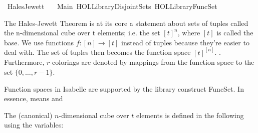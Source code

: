 %
\begin{isabellebody}%
%
%
\isadelimtheory
%
\endisadelimtheory
%
\isatagtheory
{}\isamarkupfalse%
\ {\isachardoublequoteopen}Hales{\isacharminus}{\kern0pt}Jewett{\isachardoublequoteclose}\isanewline
\ \ \ Main\ {\isachardoublequoteopen}HOL{\isacharminus}{\kern0pt}Library{\isachardot}{\kern0pt}Disjoint{\isacharunderscore}{\kern0pt}Sets{\isachardoublequoteclose}\ {\isachardoublequoteopen}HOL{\isacharminus}{\kern0pt}Library{\isachardot}{\kern0pt}FuncSet{\isachardoublequoteclose}\isanewline
{}%
\endisatagtheory
{\isafoldtheory}%
%
\isadelimtheory
%
\endisadelimtheory
%
\isadelimdocument
%
\endisadelimdocument
%
\isatagdocument
%
\isamarkuptrue%
%
\endisatagdocument
{\isafolddocument}%
%
\isadelimdocument
%
\endisadelimdocument
%
\begin{isamarkuptext}%
The Hales-Jewett Theorem is at its core a statement about sets of tuples called the n-dimensional cube over t elements; i.e. the set $[t]^n$, where $[t]$ is called the base. 
We use functions $f : [n] \rightarrow [t]$ instead of tuples because they're easier to
 deal with. The set of tuples then becomes the function space $[t]^{[n]}$.  . 
Furthermore, $r$-colorings are denoted by mappings from the function space to the set $\{0,\ldots, r-1\}$.%
\end{isamarkuptext}\isamarkuptrue%
%
\isadelimdocument
%
\endisadelimdocument
%
\isatagdocument
%
\isamarkuptrue%
%
\endisatagdocument
{\isafolddocument}%
%
\isadelimdocument
%
\endisadelimdocument
%
\begin{isamarkuptext}%
Function spaces in Isabelle are supported by the library construct FuncSet. In essence,  means  and %
\end{isamarkuptext}\isamarkuptrue%
%
\begin{isamarkuptext}%
The (canonical) $n$-dimensional cube over $t$ elements is defined in the following using the variables:


\end{isamarkuptext}
\end{isabellebody}

